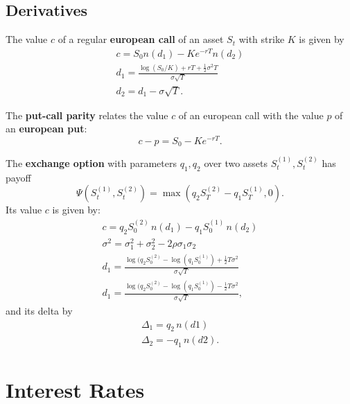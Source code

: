 \documentclass[10pt]{article}
\begin{document}
\subsection{Derivatives}
\begin{outline}
  \1 The value $c$ of a regular \textbf{european call} of an asset $S_t$ with strike $K$
  is given by
  \begin{gather*}
    c = S_0n(d_1) - Ke^{-rT}n(d_2)\\
    d_1 = \frac{\log(S_0/K) + rT + \tfrac{1}{2}\sigma^2T}{\sigma\sqrt{T}}\\
    d_2 = d_1 - \sigma\sqrt{T}.
  \end{gather*}

  \1 The \textbf{put-call parity} relates the value $c$ of an european call with the value
  $p$ of an \textbf{european put}:
  \begin{equation*}
    c - p = S_0 - Ke^{-rT}.
  \end{equation*}

  \1 The \textbf{exchange option} with parameters $q_1,q_2$ over two assets
  $S^{(1)}_t,S^{(2)}_t$ has payoff
  \begin{equation*}
    \Psi(S^{(1)}_t,S^{(2)}_t) = \max(q_2S^{(2)}_T - q_1S^{(1)}_T,0).
  \end{equation*}
  Its value $c$ is given by:
  \begin{gather*}
    c = q_2S^{(2)}_0\,n(d_1) - q_1S^{(1)}_0\,n(d_2)\\
    \sigma^2 = \sigma_1^2 + \sigma_2^2 - 2\rho\sigma_1\sigma_2\\
    d_1 = \frac{\log(q_2S^{(2)}_0 - \log(q_1S^{(1)}_0) +
      \tfrac{1}{2}T\sigma^2}{\sigma\sqrt{T}}\\
    d_1 = \frac{\log(q_2S^{(2)}_0 - \log(q_1S^{(1)}_0) -
      \tfrac{1}{2}T\sigma^2}{\sigma\sqrt{T}},
  \end{gather*}
  and its delta by
  \begin{gather*}
    \Delta_1 = q_2\,n(d1)\\
    \Delta_2 = -q_1\,n(d2).
  \end{gather*}
\end{outline}



\section{Interest Rates}
\end{document}
